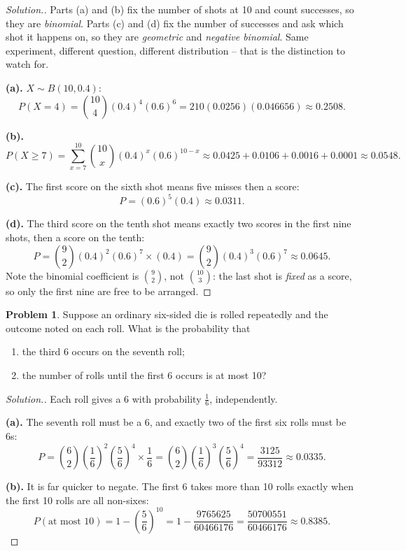 \documentclass[12pt,a4paper]{report}
\theoremstyle{definition}
\theoremstyle{plain}
\theoremstyle{definition}
\newtheorem{problemx}{Problem}[section]
\newenvironment{problem}{\begin{problemx}}{\end{problemx}}
\newenvironment{solution}
  {\renewcommand{\qedsymbol}{}\begin{proof}[\textit{Solution}.]}
  {\end{proof}}
\begin{document}
\begin{solution}
Parts (a) and (b) fix the number of shots at 10 and count successes, so they are
\emph{binomial}. Parts (c) and (d) fix the number of successes and ask which shot it
happens on, so they are \emph{geometric} and \emph{negative binomial}. Same experiment,
different question, different distribution -- that is the distinction to watch for.

\textbf{(a).} $X\sim B(10,0.4)$:
\[P(X=4) = \binom{10}{4}(0.4)^{4}(0.6)^{6} = 210(0.0256)(0.046656) \approx 0.2508.\]

\textbf{(b).} \[P(X\geq 7) = \sum_{x=7}^{10}\binom{10}{x}(0.4)^{x}(0.6)^{10-x}
 \approx 0.0425+0.0106+0.0016+0.0001 \approx 0.0548.\]

\textbf{(c).} The first score on the sixth shot means five misses then a score:
\[P = (0.6)^{5}(0.4) \approx 0.0311.\]

\textbf{(d).} The third score on the tenth shot means exactly two scores in the first
nine shots, then a score on the tenth:
\[P = \binom{9}{2}(0.4)^{2}(0.6)^{7}\times(0.4)
 = \binom{9}{2}(0.4)^{3}(0.6)^{7} \approx 0.0645.\]
Note the binomial coefficient is $\binom{9}{2}$, not $\binom{10}{3}$: the last shot is
\emph{fixed} as a score, so only the first nine are free to be arranged.
\end{solution}

\begin{problem}
Suppose an ordinary six-sided die is rolled repeatedly and the outcome noted on each
roll. What is the probability that
\begin{enumerate}
\item[(a).] the third 6 occurs on the seventh roll;
\item[(b).] the number of rolls until the first 6 occurs is at most 10?
\end{enumerate}
\end{problem}

\begin{solution}
Each roll gives a 6 with probability $\tfrac16$, independently.

\textbf{(a).} The seventh roll must be a 6, and exactly two of the first six rolls must be
6s:
\[P = \binom{6}{2}\left(\frac{1}{6}\right)^{2}\left(\frac{5}{6}\right)^{4}
 \times\frac{1}{6}
 = \binom{6}{2}\left(\frac{1}{6}\right)^{3}\left(\frac{5}{6}\right)^{4}
 = \frac{3125}{93312} \approx 0.0335.\]

\textbf{(b).} It is far quicker to negate. The first 6 takes more than 10 rolls exactly
when the first 10 rolls are all non-sixes:
\[P(\text{at most }10) = 1-\left(\frac{5}{6}\right)^{10}
 = 1-\frac{9765625}{60466176} = \frac{50700551}{60466176} \approx 0.8385.\]
\end{solution}
\end{document}
